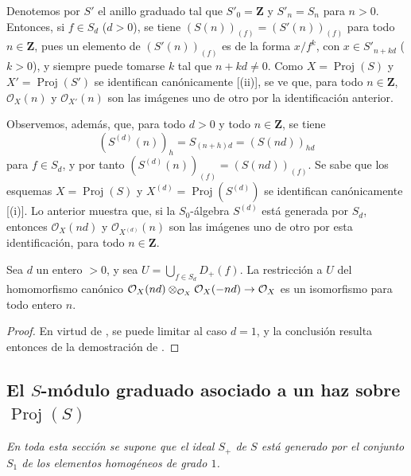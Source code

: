 \documentclass[oneside,10pt]{amsart}
\makeatletter
\newcommand{\ega@arrow}[2]{\mathchoice{#1}{#2}{#2}{#2}}
\renewcommand{\to}{\ega@arrow{\longrightarrow}{\rightarrow}}
\let\EGAOriginalLabel\label
\renewcommand{\label}[1]{\phantomsection\EGAOriginalLabel{#1}}
\makeatother
\begin{document}
\begin{env}[2.5.16]
\label{II.2.5.16-fr}
Denotemos por $S'$ el anillo graduado tal que $S'_0=\mathbf{Z}$ y $S'_n=S_n$ para $n>0$.
Entonces, si $f\in S_d$ ($d>0$), se tiene $(S(n))_{(f)}=(S'(n))_{(f)}$ para todo $n\in\mathbf{Z}$, pues un elemento de $(S'(n))_{(f)}$ es de la forma $x/f^k$, con $x\in S'_{n+kd}$ ($k>0$), y siempre puede tomarse $k$ tal que $n+kd\neq0$.
Como $X=\operatorname{Proj}(S)$ y $X'=\operatorname{Proj}(S')$ se identifican canónicamente [(ii)], se ve que, para todo $n\in\mathbf{Z}$, $\mathcal{O}_X(n)$ y $\mathcal{O}_{X'}(n)$ son las imágenes uno de otro por la identificación anterior.

Observemos, además, que, para todo $d>0$ y todo $n\in\mathbf{Z}$, se tiene
\[
  (S^{(d)}(n))_h=S_{(n+h)d}=(S(nd))_{hd}
\]
para $f\in S_d$, y por tanto $(S^{(d)}(n))_{(f)}=(S(nd))_{(f)}$.
Se sabe que los esquemas $X=\operatorname{Proj}(S)$ y $X^{(d)}=\operatorname{Proj}(S^{(d)})$ se identifican canónicamente [(i)].
Lo anterior muestra que, si la $S_0$-álgebra $S^{(d)}$ está generada por $S_d$, entonces $\mathcal{O}_X(nd)$ y $\mathcal{O}_{X^{(d)}}(n)$ son las imágenes uno de otro por esta identificación, para todo $n\in\mathbf{Z}$.
\end{env}

\begin{proposition}[2.5.17]
\label{II.2.5.17-fr}
Sea $d$ un entero $>0$, y sea $U=\bigcup_{f\in S_d}D_+(f)$.
La restricción a $U$ del homomorfismo canónico
$\mathcal{O}_X(nd)\otimes_{\mathcal{O}_X}\mathcal{O}_X(-nd)
\to\mathcal{O}_X$
es un isomorfismo para todo entero $n$.
\end{proposition}

\begin{proof}
En virtud de , se puede limitar al caso $d=1$, y la conclusión resulta entonces de la demostración de .
\end{proof}

\subsection{El $S$-módulo graduado asociado a un haz sobre $\operatorname{Proj}(S)$}
\label{subsection:II.2.6-fr}

\emph{En toda esta sección se supone que el ideal $S_+$ de $S$ está generado por el conjunto $S_1$ de los elementos homogéneos de grado $1$.}
\end{document}
